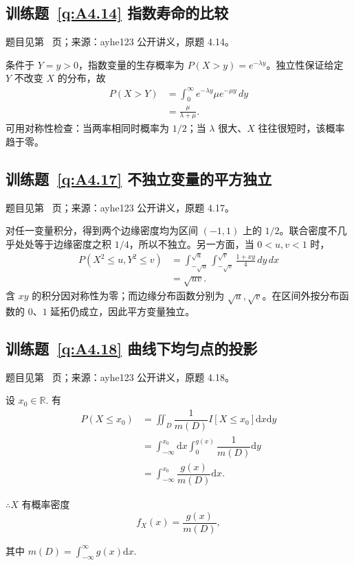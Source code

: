 \subsection*{训练题~\ref{q:A4.14} 指数寿命的比较}\label{a:A4.14}{\small 题目见第~\pageref{q:A4.14} 页；来源：ayhe123 公开讲义，原题 4.14。}
\begin{solve}条件于 $Y=y>0$，指数变量的生存概率为 $P(X>y)=e^{-\lambda y}$。独立性保证给定 $Y$ 不改变 $X$ 的分布，故\[\begin{aligned}P(X>Y)&=\int_0^\infty e^{-\lambda y}\mu e^{-\mu y}\,dy\\&=\frac\mu{\lambda+\mu}.\end{aligned}\]可用对称性检查：当两率相同时概率为 $1/2$；当 $\lambda$ 很大、$X$ 往往很短时，该概率趋于零。\end{solve}

\subsection*{训练题~\ref{q:A4.17} 不独立变量的平方独立}\label{a:A4.17}{\small 题目见第~\pageref{q:A4.17} 页；来源：ayhe123 公开讲义，原题 4.17。}
\begin{solve}对任一变量积分，得到两个边缘密度均为区间 $(-1,1)$ 上的 $1/2$。联合密度不几乎处处等于边缘密度之积 $1/4$，所以不独立。另一方面，当 $0<u,v<1$ 时，\[\begin{aligned}P(X^2\le u,Y^2\le v)&=\int_{-\sqrt u}^{\sqrt u}\int_{-\sqrt v}^{\sqrt v}\frac{1+xy}{4}\,dy\,dx\\&=\sqrt{uv}.\end{aligned}\]含 $xy$ 的积分因对称性为零；而边缘分布函数分别为 $\sqrt u,\sqrt v$。在区间外按分布函数的 $0$、$1$ 延拓仍成立，因此平方变量独立。\end{solve}

\subsection*{训练题~\ref{q:A4.18} 曲线下均匀点的投影}\label{a:A4.18}{\small 题目见第~\pageref{q:A4.18} 页；来源：ayhe123 公开讲义，原题 4.18。}
\begin{solve}
    设 $x_0\in\mathbb{R}$. 有
    \begin{align*}
        P(X\leq x_0) & =\iint_D\dfrac{1}{m(D)}I[X\leq x_0]\mathrm{d}x\mathrm{d}y \\
        & =\int_{-\infty}^{x_0}\mathrm{d}x\int_0^{g(x)}\dfrac{1}{m(D)}\mathrm{d}y \\
        & =\int_{-\infty}^{x_0}\dfrac{g(x)}{m(D)}\mathrm{d}x.
    \end{align*}

    $\therefore X$ 有概率密度
    \[f_X(x)=\dfrac{g(x)}{m(D)},\]

    其中 $m(D)=\int_{-\infty}^\infty g(x)\mathrm{d}x$.
\end{solve}

